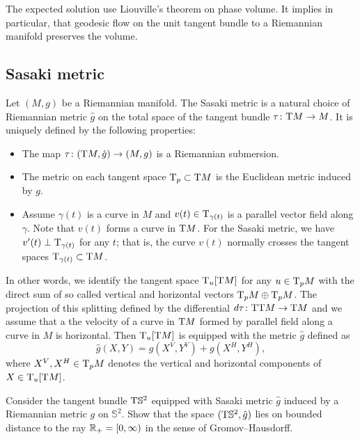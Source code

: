 The expected solution use Liouville's theorem on phase volume.
It implies in particular, that geodesic flow on the unit tangent bundle to a Riemannian manifold preserves the volume.


\subsection*{Sasaki metric}
\label{pr:Sasaki metric}

Let $(M,g)$ be a Riemannian manifold.
The Sasaki metric is a natural choice of Riemannian metric $\hat g$ on the total space of the tangent bundle $\tau\colon\mathrm{T} M\to M$.
It is uniquely defined by the following properties:
\begin{itemize}
\item The map $\tau\colon(\mathrm{T} M,\hat g)\to (M,g)$ is a Riemannian submersion.
\item The metric on each tangent space $\mathrm{T}_p\subset \mathrm{T} M$ is the Euclidean metric induced by $g$.
\item Assume $\gamma(t)$ is a curve in $M$ and $v(t)\in\mathrm{T}_{\gamma(t)}$ is a parallel vector field along $\gamma$. 
Note that $v(t)$ forms a curve in $\mathrm{T} M$.
For the Sasaki metric, we have $v'(t)\perp \mathrm{T}_{\gamma(t)}$ for any $t$;
that is, the curve $v(t)$ normally crosses the tangent spaces $\mathrm{T}_{\gamma(t)}\subset \mathrm{T} M$.
\end{itemize}

In other words, we identify the tangent space 
$\mathrm{T}_u[\mathrm{T} M]$ for any $u\in \mathrm{T}_p M$ with the direct sum of so called vertical and horizontal vectors $\mathrm{T}_p M\oplus \mathrm{T}_p M$.
The projection of this splitting defined by the differential $d\tau\colon\mathrm{T}\mathrm{T} M\to \mathrm{T} M$
and we assume that a the velocity of a curve in $\mathrm{T} M$ formed by parallel field along a curve in $M$ is horizontal.
Then $\mathrm{T}_u[\mathrm{T} M]$ is equipped with the metric $\hat g$ defined as 
\[\hat g(X,Y)=g(X^V,Y^V)+g(X^H,Y^H),\]
where $X^V,X^H\in\mathrm{T}_pM$ denotes the vertical and horizontal components of $X\in\mathrm{T}_u[\mathrm{T} M]$.



\begin{pr}
Consider the tangent bundle $\mathrm{T} \mathbb{S}^2$ 
equipped with Sasaki metric $\hat g$ induced by a Riemannian metric $g$ on $\mathbb{S}^2$.
Show that
the space $(\mathrm{T} \mathbb{S}^2, \hat g)$ lies on bounded distance to the ray $\mathbb{R}_+=[0,\infty)$ in the sense of Gromov--Hausdorff.
\end{pr}


